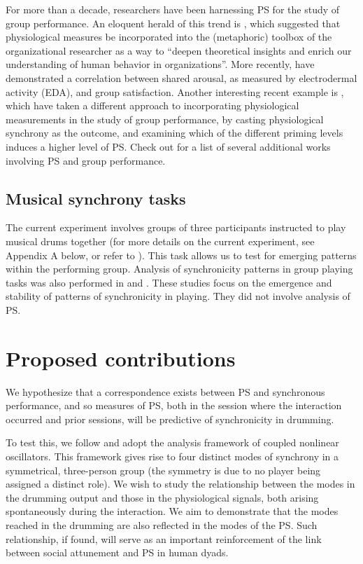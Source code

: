 \documentclass[a4paper, 11pt]{report}      %
\begin{document}
For more than a decade, researchers have been harnessing PS for the study of group performance. An eloquent herald of this trend is \citet{akinola2010measuring}, which suggested that physiological measures be incorporated into the (metaphoric) toolbox of the organizational researcher as a way to \enquote{deepen theoretical insights and enrich our understanding of human behavior in organizations}. More recently,  \citet{chikersal2017deep} have demonstrated a correlation between shared arousal, as measured by electrodermal activity (EDA), and group satisfaction. Another interesting recent example is \citet{danyluck2018intergroup}, which have taken a different approach to incorporating physiological measurements in the study of group performance, by casting physiological synchrony as the outcome, and examining which of the different priming levels induces a higher level of PS. Check out \citet{jar202physiological} for a list of several additional works involving PS and group performance.

\subsection{Musical synchrony tasks}
The current experiment involves groups of three participants instructed to play musical drums together (for more details on the current experiment, see Appendix A below, or refer to \cite{gordon2020physio}). This task allows us to test for emerging patterns within the performing group. Analysis of synchronicity patterns in group playing tasks was also performed in  \cite{abp2017symmetry} and \cite{shahal2020synchronization}. These studies focus on the emergence and stability of patterns of synchronicity in playing. They did not involve analysis of PS.

\section{Proposed contributions}

We hypothesize that a correspondence exists between PS and synchronous performance, and so measures of PS, both in the session where the interaction occurred and prior sessions, will be predictive of synchronicity in drumming. 

To test this, we follow \cite{abp2017symmetry} and adopt the analysis framework of coupled nonlinear oscillators. This framework gives rise to four distinct modes of synchrony in a symmetrical, three-person group (the symmetry is due to no player being assigned a distinct role). We wish to study the relationship between the modes in the drumming output and those in the physiological signals, both arising spontaneously during the interaction. We aim to demonstrate that the modes reached in the drumming are also reflected in the modes of the PS. Such relationship, if found, will serve as an important reinforcement of the link between social attunement and PS in human dyads. 
\end{document}
